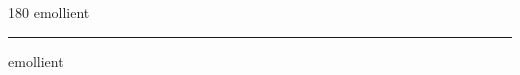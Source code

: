 
\begin{frame}
\begin{center}
\begin{turn}{180}
{\fontsize{2.5cm}{1em}\selectfont emollient}
\end{turn}
\vspace{1em}\par  
\hrule
\vspace{1em}\par  
{\fontsize{2.5cm}{1em}\selectfont emollient}
\end{center}
\end{frame}
